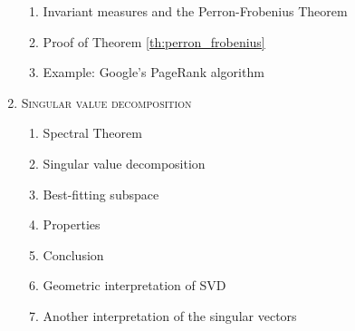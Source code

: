 \begin{enumerate}[label=\textbf{\arabic*.}]
\begin{enumerate}[label=\arabic*.]
\item Invariant measures and the Perron-Frobenius Theorem
\item Proof of Theorem \ref{th:perron_frobenius}
\item Example: Google's PageRank algorithm
\end{enumerate}
\item \textsc{Singular value decomposition}
\begin{enumerate}[label=\arabic*.]
\item Spectral Theorem
\item Singular value decomposition
\item Best-fitting subspace
\item Properties
\item Conclusion
\item Geometric interpretation of SVD
\item Another interpretation of the singular vectors
\end{enumerate}
\end{enumerate}
